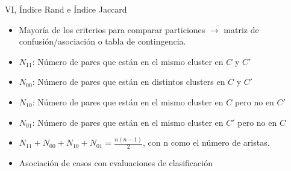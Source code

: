 \begin{frame}{VI, \'Indice Rand e \'Indice Jaccard}
    

    \begin{itemize}\fontsize{9pt}{10}\selectfont
        \item Mayor\'ia de los criterios para comparar particiones $\rightarrow$ matriz de confusi\'on/asociaci\'on o tabla de contingencia.
        \item $N_{11}$: N\'umero de pares que est\'an en el mismo cluster en $C$ y $C'$
        \item $N_{00}$: N\'umero de pares que est\'an en distintos clusters en $C$ y $C'$
        \item $N_{10}$: N\'umero de pares que est\'an en el mismo cluster en $C$ pero no en $C'$
        \item $N_{01}$: N\'umero de pares que est\'an en el mismo cluster en $C'$ pero no en $C$
        \item $N_{11} + N_{00} + N_{10} + N_{01} = \frac{n(n-1)}{2}$, con n como el n\'umero de aristas.
        \item Asociaci\'on de casos con evaluaciones de clasificaci\'on
    \end{itemize}

\end{frame}


